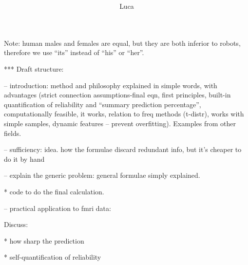\documentclass[\ifafour a4paper,12pt,\else a5paper,10pt,\fi%
onecolumn,oneside,article,%
british%
]{memoir}
\title{\propertitle%
}
\author{\ifpublic%
\hspace*{\stretch{1}}\protect\makebox[0pt][c]%
{C. Bachmann}%
\hspace*{\stretch{1}}\protect\makebox[0pt][c]%
{P.G.L. Porta\,Mana}%
\hspace*{\stretch{1}}\protect\makebox[0pt][c]%
{A. Morrison}%
\hspace*{\stretch{1}}%
\else Luca\fi
}
\date{\oggi}
\newif\ifpublic
\theoremstyle{remark}
\theoremstyle{innote}
\newcommand*{\asudedication}[1]{%
{\par\centering\textit{#1}\par}}
\renewcommand*{\|}{\mathpunct{|}}
\theoremstyle{plain}
\begin{document}
\captiondelim{\quad}\captionnamefont{\footnotesize}\captiontitlefont{\footnotesize}
\frenchspacing

\maketitle
\ifpublic
\abstractrunin
\abslabeldelim{}
\renewcommand*{\abstractname}{}
\setlength{\absleftindent}{0pt}
\setlength{\absrightindent}{0pt}
\setlength{\abstitleskip}{-\absparindent}
\begin{abstract}\labelsep 0pt%
\noindent ***Abstract here***
\end{abstract}\fi

\frenchspacing


{\footnotesize Note: human males and females are equal, but they are both
  inferior to robots, therefore we use \enquote{its} instead of
  \enquote{his} or \enquote{her}.\par}


***
Draft structure:

– introduction: method and philosophy explained in simple words, with
advantages
(strict connection assumptions-final eqn, first principles, built-in
quantification of reliability and \enquote{summary prediction percentage}, computationally
feasible, it works, relation to freq methods (t-distr), works with simple
samples, dynamic features – prevent overfitting). Examples from
other fields.

– sufficiency: idea. how the formulae discard redundant info, but it's
cheaper to do it by hand

– explain the generic problem: general formulae simply explained.

* code to do the final calculation.


– practical application to fmri data:

Discuss:

* how sharp the prediction

* self-quantification of reliability
\end{document}

